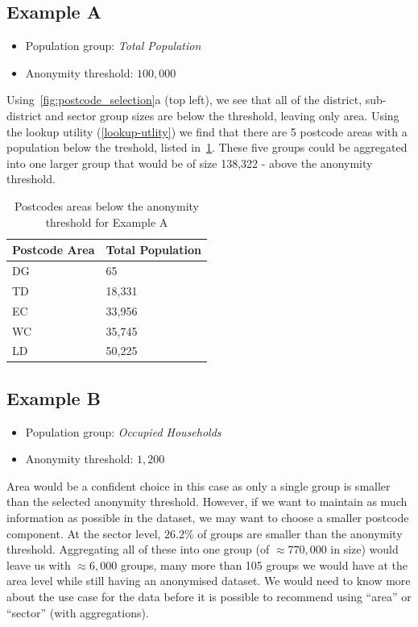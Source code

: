 \documentclass[12pt, a4paper]{article}
\begin{document}
\subsection{Example A}\label{exampleA}

\begin{itemize}
\item Population group: \textit{Total Population}
\item Anonymity threshold: $100,000$
\end{itemize}
Using~\cref{fig:postcode_selection}a (top left), we see that all of the district, sub-district and sector group sizes are below the threshold, leaving only area. Using the lookup utility (\cref{lookup-utlity}) we find that there are 5 postcode areas with a population below the treshold, listed in~\cref{table:example_a}. These five groups could be aggregated into one larger group that would be of size 138,322 - above the anonymity threshold.

\begin{table}[h]
\begin{center}
\begin{tabular}{ll}
    \toprule
    Postcode Area &  Total Population \\
    \midrule
    DG   &                65 \\
    TD   &             18,331 \\
    EC   &             33,956 \\
    WC   &             35,745 \\
    LD   &             50,225 \\
    \bottomrule
\end{tabular}
\caption{Postcodes areas below the anonymity threshold for Example A}\label{table:example_a}
\end{center}
\end{table}

\subsection{Example B}

\begin{itemize}
    \item Population group: \textit{Occupied Households}
    \item Anonymity threshold: $1,200$
\end{itemize}

Area would be a confident choice in this case as only a single group is smaller than the selected anonymity threshold. However, if we want to maintain as much information as possible in the dataset, we may want to choose a smaller postcode component. At the sector level, $26.2\%$ of groups are smaller than the anonymity threshold. Aggregating all of these into one group (of $\approx770,000$ in size) would leave us with $\approx6,000$ groups, many more than 105 groups we would have at the area level while still having an anonymised dataset. We would need to know more about the use case for the data before it is possible to recommend using ``area'' or ``sector'' (with aggregations).
\end{document}

